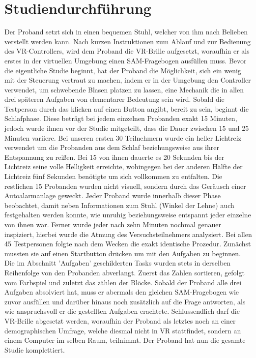 \section{Studiendurchführung}

Der Proband setzt sich in einen bequemen Stuhl, welcher von ihm nach Belieben verstellt werden kann. Nach kurzen Instruktionen zum Ablauf und zur Bedienung des VR-Controllers, wird dem Proband die VR-Brille aufgesetzt, woraufhin er als erstes in der virtuellen Umgebung einen SAM-Fragebogen ausfüllen muss. %
Bevor die eigentliche Studie beginnt, hat der Proband die Möglichkeit, sich ein wenig mit der Steuerung vertraut zu machen, indem er in der Umgebung den Controller verwendet, um schwebende Blasen platzen zu lassen, eine Mechanik die in allen drei späteren Aufgaben von elementarer Bedeutung sein wird. Sobald die Testperson durch das klicken auf einen Button angibt, bereit zu sein, beginnt die Schlafphase. Diese beträgt bei jedem einzelnen Probanden exakt 15 Minuten, jedoch wurde ihnen vor der Studie mitgeteilt, dass die Dauer zwischen 15 und 25 Minuten variiere. %
Bei unseren ersten 30 Teilnehmern wurde ein heller Lichtreiz verwendet um die Probanden aus dem Schlaf beziehungsweise aus ihrer Entspannung zu reißen. Bei 15 von ihnen dauerte es 20 Sekunden bis der Lichtreiz seine volle Helligkeit erreichte, wohingegen bei der anderen Hälfte der Lichtreiz fünf Sekunden benötigte um sich vollkommen zu entfalten.  Die restlichen 15 Probanden wurden nicht visuell, sondern durch das Geräusch einer Autoalarmanlage geweckt. %
Jeder Proband wurde innerhalb dieser Phase beobachtet, damit neben Informationen zum Stuhl (Winkel der Lehne) auch festgehalten werden konnte, wie unruhig beziehungsweise entspannt jeder einzelne von ihnen war. Ferner wurde jeder nach zehn Minuten nochmal genauer inspiziert, hierbei wurde die Atmung des Versuchsteilnehmers analysiert.
Bei allen 45 Testpersonen folgte nach dem Wecken die exakt identische Prozedur. Zunächst mussten sie auf einen Startbutton drücken um mit den Aufgaben zu beginnen. Die im Abschnitt 'Aufgaben' geschilderten Tasks wurden stets in derselben Reihenfolge von den Probanden abverlangt. Zuerst das Zahlen sortieren, gefolgt vom Farbspiel und zuletzt das zählen der Blöcke. %
Sobald der Proband alle drei Aufgaben absolviert hat, muss er abermals den gleichen SAM-Fragebogen wie zuvor ausfüllen und darüber hinaus noch zusätzlich auf die Frage antworten, als wie anspruchsvoll er die gestellten Aufgaben erachtete.
Schlussendlich darf die VR-Brille abgesetzt werden, woraufhin der Proband als letztes noch an einer demographischen Umfrage, welche diesmal nicht in VR stattfindet, sondern an einem Computer im selben Raum, teilnimmt. Der Proband hat nun die gesamte Studie komplettiert.

